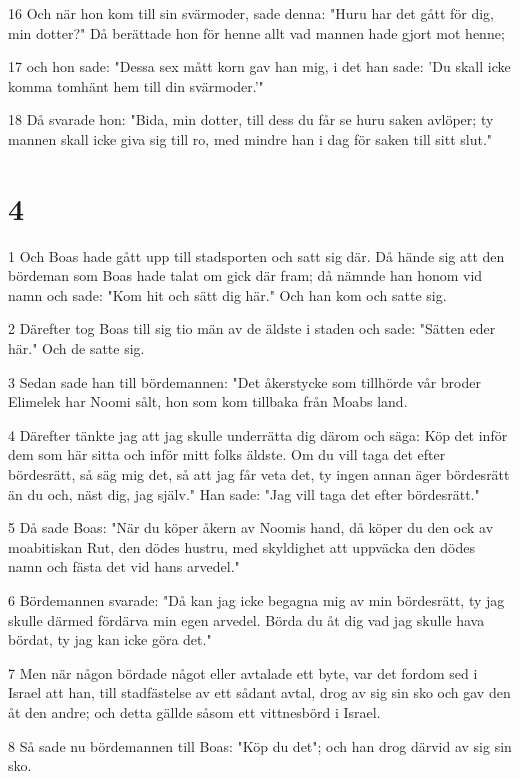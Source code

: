 \par 16 Och när hon kom till sin svärmoder, sade denna: "Huru har det gått för dig, min dotter?" Då berättade hon för henne allt vad mannen hade gjort mot henne;
\par 17 och hon sade: "Dessa sex mått korn gav han mig, i det han sade: 'Du skall icke komma tomhänt hem till din svärmoder.'"
\par 18 Då svarade hon: "Bida, min dotter, till dess du får se huru saken avlöper; ty mannen skall icke giva sig till ro, med mindre han i dag för saken till sitt slut."

\chapter{4}

\par 1 Och Boas hade gått upp till stadsporten och satt sig där. Då hände sig att den bördeman som Boas hade talat om gick där fram; då nämnde han honom vid namn och sade: "Kom hit och sätt dig här." Och han kom och satte sig.
\par 2 Därefter tog Boas till sig tio män av de äldste i staden och sade: "Sätten eder här." Och de satte sig.
\par 3 Sedan sade han till bördemannen: "Det åkerstycke som tillhörde vår broder Elimelek har Noomi sålt, hon som kom tillbaka från Moabs land.
\par 4 Därefter tänkte jag att jag skulle underrätta dig därom och säga: Köp det inför dem som här sitta och inför mitt folks äldste. Om du vill taga det efter bördesrätt, så säg mig det, så att jag får veta det, ty ingen annan äger bördesrätt än du och, näst dig, jag själv." Han sade: "Jag vill taga det efter bördesrätt."
\par 5 Då sade Boas: "När du köper åkern av Noomis hand, då köper du den ock av moabitiskan Rut, den dödes hustru, med skyldighet att uppväcka den dödes namn och fästa det vid hans arvedel."
\par 6 Bördemannen svarade: "Då kan jag icke begagna mig av min bördesrätt, ty jag skulle därmed fördärva min egen arvedel. Börda du åt dig vad jag skulle hava bördat, ty jag kan icke göra det."
\par 7 Men när någon bördade något eller avtalade ett byte, var det fordom sed i Israel att han, till stadfästelse av ett sådant avtal, drog av sig sin sko och gav den åt den andre; och detta gällde såsom ett vittnesbörd i Israel.
\par 8 Så sade nu bördemannen till Boas: "Köp du det"; och han drog därvid av sig sin sko.
